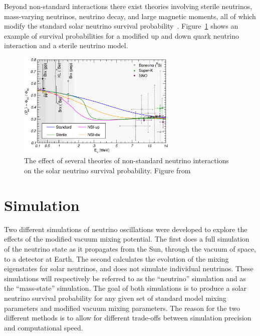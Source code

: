 Beyond non-standard interactions there exist theories involving sterile neutrinos,
mass-varying neutrinos, neutrino decay, and large magnetic moments, all of
which modify the standard solar neutrino survival probability~\citep{maltoni_solar, richie_nsi}.
Figure~\ref{fig:maltoni_mixing} shows an example of survival probabilities
for a modified up and down quark neutrino interaction and a sterile neutrino
model.

\begin{figure}[htbp]
\centering
\includegraphics[width=0.68\textwidth]{maltoni_mixing}
\caption[Non-Standard Interactions Survival Probabilities]{The effect of several theories of non-standard neutrino interactions
    on the solar neutrino survival probability. Figure from~\citep{maltoni_solar}}
\label{fig:maltoni_mixing}
\end{figure}

\section{Simulation}
Two different simulations of neutrino oscillations were developed to explore the
effects of the modified vacuum mixing potential.
The first
does a full simulation of the neutrino state as it propagates from the
Sun, through the vacuum of space, to a detector at Earth.
The second calculates the evolution
of the mixing eigenstates for solar neutrinos, and does not simulate individual
neutrinos.
These simulations will respectively be referred to as the ``neutrino'' simulation
and as the ``mass-state'' simulation.
The goal of both simulations is to produce a solar neutrino survival probability
for any given set of standard model mixing parameters and modified vacuum
mixing parameters.
The reason for the two different methods is to allow for different
trade-offs between simulation precision and computational speed.

